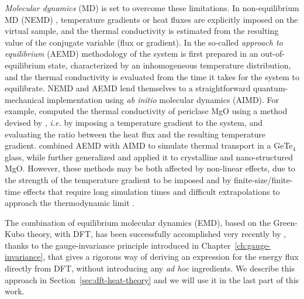 \emph{Molecular dynamics} (MD) \cite{Allen1989,Frenkel2001} is set to overcome these limitations. 
In non-equilibrium MD (NEMD) \cite{Evans1990,Muller-Plathe1997}, temperature gradients or heat fluxes are explicitly imposed on the virtual sample, and the thermal conductivity is estimated from the resulting value of the conjugate variable (flux or gradient). 
In the so-called \emph{approach to equilibrium} (AEMD) methodology of \citet{Lampin2013} the system is first prepared in an out-of-equilibrium state, characterized by an inhomogeneous temperature distribution, and the thermal conductivity is evaluated from the time it takes for the system to equilibrate. 
NEMD and AEMD lend themselves to a straightforward quantum-mechanical implementation \cite{Stackhouse2010b,Bouzid2017} using \emph{ab initio} molecular dynamics (AIMD). For example, \citet{Stackhouse2010b} computed the thermal conductivity of periclase MgO using a method devised by \citet{Muller-Plathe1997}, \emph{i.e.} by imposing a temperature gradient to the system, and evaluating the ratio between the heat flux and the resulting temperature gradient.
\citet{Bouzid2017} combined AEMD with AIMD to simulate thermal transport in a GeTe$_4$ glass, while \citet{Puligheddu2017} further generalized and applied it to crystalline and nano-structured MgO.
However, these methods may be both affected by non-linear effects, due to the strength of the temperature gradient to be imposed \cite{Schelling2002,He2012} and by finite-size/finite-time effects that require long simulation times and difficult extrapolations to approach the thermodynamic limit \cite{Sellan2010,He2011,He2012,Zaoui2016,Wang2017}. 

The combination of equilibrium molecular dynamics (EMD), based on the Green-Kubo theory, with DFT, has been successfully accomplished very recently by \citet{Marcolongo2016}, thanks to the gauge-invariance principle introduced in Chapter~\ref{ch:gauge-invariance}, that gives a rigorous way of deriving an expression for the energy flux directly from DFT, without introducing any \emph{ad hoc} ingredients. We describe this approach in Section~\ref{sec:dft-heat-theory} and we will use it in the last part of this work.

